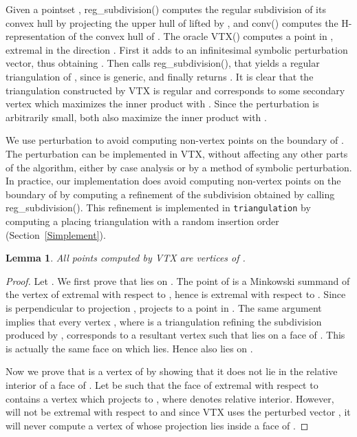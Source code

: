 \documentclass{article}
\newtheorem{lemma}{Lemma}
\begin{document}
Given a pointset , {reg\_subdivision()} 
computes the regular subdivision of its convex hull by projecting 
the upper hull of  lifted by , and
{conv()} computes the H-representation of the convex hull of .
The oracle {VTX}() 
computes a point in , extremal
in the direction . 
First it adds to  an infinitesimal symbolic
perturbation vector, thus obtaining . 
Then calls reg\_subdivision(),  that yields 
a regular triangulation  of , since  is generic,
and finally returns . 
It is clear that the 
triangulation  constructed by {VTX} is regular and
corresponds to some secondary vertex  which maximizes the
inner product with . 
Since the perturbation is arbitrarily small, both  also maximize the
inner product with .

We use perturbation to avoid computing non-vertex points on the boundary of .
The perturbation can be implemented in VTX, without
affecting any other parts of the algorithm, either by case analysis or by
a method of symbolic perturbation.
In practice, our implementation does avoid computing non-vertex points on 
the boundary of  by 
computing a refinement of the subdivision obtained by calling 
reg\_subdivision(). 
This refinement is implemented in {\tt triangulation} 
by computing a placing triangulation 
with a random insertion order~ (Section~\ref{Simplement}).

\begin{lemma}\label{Lpointonboundary}
All points computed by {\em VTX} are vertices of .
\end{lemma} 
\begin{proof}
Let .
We first prove that  lies on .
The point  of  is a Minkowski summand of the vertex  of
 extremal with respect to , hence  is extremal
with respect to . 
Since  is perpendicular to projection , 
projects to a point in .
The same argument implies that every vertex , where  is a
triangulation refining 
the subdivision produced by , corresponds to a  resultant vertex
 such that  lies on a face
of . This is actually the same face on which  lies.
Hence  also lies on .

Now we prove that  is a vertex of  
by showing that it does not lie in the 
relative interior of a face of .
Let  be such that 
the face  of  extremal with respect to
 contains a vertex  which projects to
, where  denotes relative interior.
However,  will not be extremal with respect 
to  and since VTX uses the perturbed vector , 
it will never compute a vertex of   whose projection lies inside a face 
of . 
\end{proof}
\end{document}
